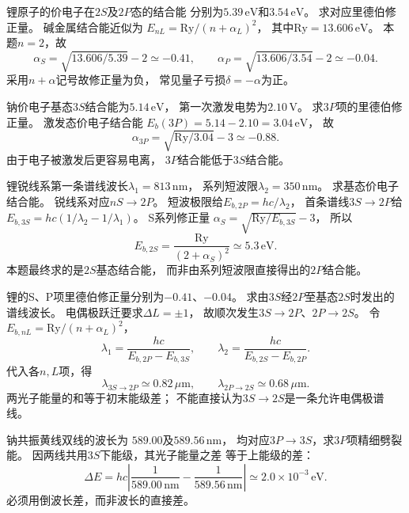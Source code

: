 
锂原子的价电子在$2S$及$2P$态的结合能
分别为$5.39\,\mathrm{eV}$和$3.54\,\mathrm{eV}$。
求对应里德伯修正量。
\exsolution
碱金属结合能近似为
$E_{nL}=\mathrm{Ry}/(n+\alpha_L)^2$，
其中$\mathrm{Ry}=13.606\,\mathrm{eV}$。
本题$n=2$，故
\[
 \boxed{\alpha_S=\sqrt{13.606/5.39}-2\simeq-0.41},
 \qquad
 \boxed{\alpha_P=\sqrt{13.606/3.54}-2\simeq-0.04}.
\]
\excheck 采用$n+\alpha$记号故修正量为负，
常见量子亏损$\delta=-\alpha$为正。

钠价电子基态$3S$结合能为$5.14\,\mathrm{eV}$，
第一次激发电势为$2.10\,\mathrm V$。
求$3P$项的里德伯修正量。
\exsolution
激发态价电子结合能
$E_b(3P)=5.14-2.10=3.04\,\mathrm{eV}$，
故
\[
 \boxed{\alpha_{3P}=\sqrt{\mathrm{Ry}/3.04}-3
 \simeq-0.88}.
\]
\excheck 由于电子被激发后更容易电离，
$3P$结合能低于$3S$结合能。

锂锐线系第一条谱线波长$\lambda_1=813\,\mathrm{nm}$，
系列短波限$\lambda_2=350\,\mathrm{nm}$。
求基态价电子结合能。
\exsolution
锐线系对应$nS\to2P$。
短波极限给$E_{b,2P}=hc/\lambda_2$，
首条谱线$3S\to2P$给
$E_{b,3S}=hc(1/\lambda_2-1/\lambda_1)$。
S系列修正量
$\alpha_S=\sqrt{\mathrm{Ry}/E_{b,3S}}-3$，
所以
\[
 \boxed{E_{b,2S}=\frac{\mathrm{Ry}}{(2+\alpha_S)^2}
 \simeq5.3\,\mathrm{eV}}.
\]
\excheck 本题最终求的是$2S$基态结合能，
而非由系列短波限直接得出的$2P$结合能。

锂的S、P项里德伯修正量分别为$-0.41$、$-0.04$。
求由$3S$经$2P$至基态$2S$时发出的谱线波长。
\exsolution
电偶极跃迁要求$\Delta L=\pm1$，
故顺次发生$3S\to2P$、$2P\to2S$。
令$E_{b,nL}=\mathrm{Ry}/(n+\alpha_L)^2$，
\[
 \lambda_1=\frac{hc}{E_{b,2P}-E_{b,3S}},
 \qquad
 \lambda_2=\frac{hc}{E_{b,2S}-E_{b,2P}}.
\]
代入各$n,L$项，得
\[
 \boxed{\lambda_{3S\to2P}\simeq0.82\,\mu\mathrm m},
 \qquad
 \boxed{\lambda_{2P\to2S}\simeq0.68\,\mu\mathrm m}.
\]
\excheck 两光子能量的和等于初末能级差；
不能直接认为$3S\to2S$是一条允许电偶极谱线。

钠共振黄线双线的波长为
$589.00$及$589.56\,\mathrm{nm}$，
均对应$3P\to3S$，求$3P$项精细劈裂能。
\exsolution
因两线共用$3S$下能级，其光子能量之差
等于上能级的差：
\[
 \boxed{\Delta E=hc\left|
 \frac1{589.00\,\mathrm{nm}}-\frac1{589.56\,\mathrm{nm}}
 \right|\simeq2.0\times10^{-3}\,\mathrm{eV}}.
\]
\excheck 必须用倒波长差，而非波长的直接差。

